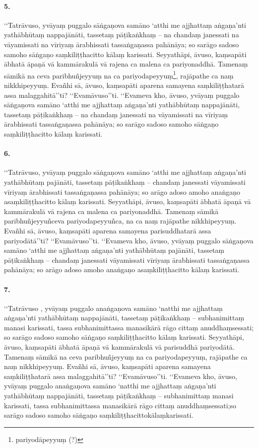 \paragraph{5.} ‘‘Tatrāvuso, yvāyaṃ puggalo sāṅgaṇova samāno ‘atthi me ajjhattaṃ aṅgaṇa’nti yathābhūtaṃ nappajānāti, tassetaṃ pāṭikaṅkhaṃ – na chandaṃ janessati na vāyamissati na vīriyaṃ ārabhissati tassaṅgaṇassa pahānāya; so sarāgo sadoso samoho sāṅgaṇo saṃkiliṭṭhacitto kālaṃ karissati. Seyyathāpi, āvuso, kaṃsapāti ābhatā āpaṇā vā kammārakulā vā rajena ca malena ca pariyonaddhā. Tamenaṃ sāmikā na ceva paribhuñjeyyuṃ na ca pariyodapeyyuṃ\footnote{pariyodāpeyyuṃ (?)}, rajāpathe ca naṃ nikkhipeyyuṃ. Evañhi sā, āvuso, kaṃsapāti aparena samayena saṃkiliṭṭhatarā assa malaggahitā’’ti? ‘‘Evamāvuso’’ti. ‘‘Evameva kho, āvuso, yvāyaṃ puggalo sāṅgaṇova samāno ‘atthi me ajjhattaṃ aṅgaṇa’nti yathābhūtaṃ nappajānāti, tassetaṃ pāṭikaṅkhaṃ – na chandaṃ janessati na vāyamissati na vīriyaṃ ārabhissati tassaṅgaṇassa pahānāya; so sarāgo sadoso samoho sāṅgaṇo saṃkiliṭṭhacitto kālaṃ karissati.

\paragraph{6.} ‘‘Tatrāvuso, yvāyaṃ puggalo sāṅgaṇova samāno ‘atthi me ajjhattaṃ aṅgaṇa’nti yathābhūtaṃ pajānāti, tassetaṃ pāṭikaṅkhaṃ – chandaṃ janessati vāyamissati vīriyaṃ ārabhissati tassaṅgaṇassa pahānāya; so arāgo adoso amoho anaṅgaṇo asaṃkiliṭṭhacitto kālaṃ karissati. Seyyathāpi, āvuso, kaṃsapāti ābhatā āpaṇā vā kammārakulā vā rajena ca malena ca pariyonaddhā. Tamenaṃ sāmikā paribhuñjeyyuñceva pariyodapeyyuñca, na ca naṃ rajāpathe nikkhipeyyuṃ. Evañhi sā, āvuso, kaṃsapāti aparena samayena parisuddhatarā assa pariyodātā’’ti? ‘‘Evamāvuso’’ti. ‘‘Evameva kho, āvuso, yvāyaṃ puggalo sāṅgaṇova samāno ‘atthi me ajjhattaṃ aṅgaṇa’nti yathābhūtaṃ pajānāti, tassetaṃ pāṭikaṅkhaṃ – chandaṃ janessati vāyamissati vīriyaṃ ārabhissati tassaṅgaṇassa pahānāya; so arāgo adoso amoho anaṅgaṇo asaṃkiliṭṭhacitto kālaṃ karissati.

\paragraph{7.} ‘‘Tatrāvuso , yvāyaṃ puggalo anaṅgaṇova samāno ‘natthi me ajjhattaṃ aṅgaṇa’nti yathābhūtaṃ nappajānāti, tassetaṃ pāṭikaṅkhaṃ – subhanimittaṃ manasi karissati, tassa subhanimittassa manasikārā rāgo cittaṃ anuddhaṃsessati; so sarāgo sadoso samoho sāṅgaṇo saṃkiliṭṭhacitto kālaṃ karissati. Seyyathāpi, āvuso, kaṃsapāti ābhatā āpaṇā vā kammārakulā vā parisuddhā pariyodātā. Tamenaṃ sāmikā na ceva paribhuñjeyyuṃ na ca pariyodapeyyuṃ, rajāpathe ca naṃ nikkhipeyyuṃ. Evañhi sā, āvuso, kaṃsapāti aparena samayena saṃkiliṭṭhatarā assa malaggahitā’’ti? ‘‘Evamāvuso’’ti. ‘‘Evameva kho, āvuso, yvāyaṃ puggalo anaṅgaṇova samāno ‘natthi me ajjhattaṃ aṅgaṇa’nti yathābhūtaṃ nappajānāti, tassetaṃ pāṭikaṅkhaṃ – subhanimittaṃ manasi karissati, tassa subhanimittassa manasikārā rāgo cittaṃ anuddhaṃsessati;so sarāgo sadoso samoho sāṅgaṇo saṃkiliṭṭhacittokālaṃkarissati.

